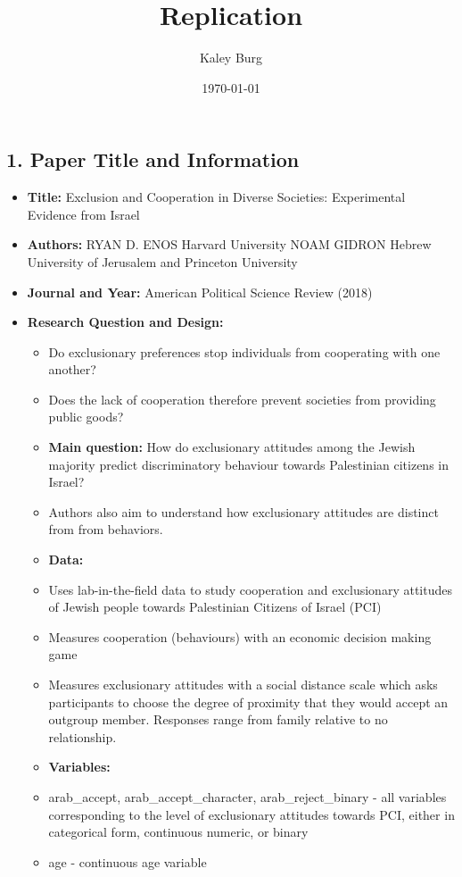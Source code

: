 \documentclass[12pt,letterpaper]{article}
\title{Replication}
\date{\today}
\author{Kaley Burg}
\begin{document}
	\maketitle
	\subsection*{1. Paper Title and Information}
	\begin{itemize}
		\item \textbf{Title:} Exclusion and Cooperation in Diverse Societies: Experimental Evidence from Israel
		\item \textbf{Authors:} RYAN D. ENOS Harvard University NOAM GIDRON Hebrew University of Jerusalem and Princeton University
		\item \textbf{Journal and Year:} American Political Science Review (2018)
		\item \textbf{Research Question and Design:}
			\begin{itemize}
				\item Do exclusionary preferences stop individuals from cooperating with one another?
				\item Does the lack of cooperation therefore prevent societies from providing public goods?
				\item \textbf{Main question:} How do exclusionary attitudes among the Jewish majority predict discriminatory behaviour towards Palestinian citizens in Israel?
				\item Authors also aim to understand how exclusionary attitudes are distinct from from behaviors.
				\item \textbf{Data:}
				\item Uses lab-in-the-field data to study cooperation and exclusionary attitudes of Jewish people towards Palestinian Citizens of Israel (PCI)
				\item Measures cooperation (behaviours) with an economic decision making game
				\item Measures exclusionary attitudes with a social distance scale which asks participants to choose the degree of proximity that they would accept an outgroup member. Responses range from family relative to no relationship.
				\item \textbf{Variables:}
				\item arab\_accept, arab\_accept\_character, arab\_reject\_binary - all variables corresponding to the level of exclusionary attitudes towards PCI, either in categorical form, continuous numeric, or binary
				\item age - continuous age variable

\end{itemize}
\end{itemize}
\end{document}
